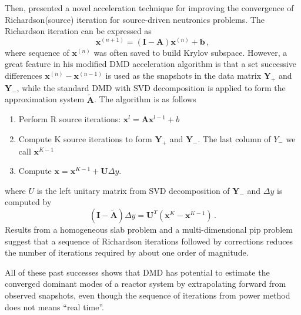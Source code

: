 Then, \citet{mcclarren_acceleration_2018} presented a novel acceleration technique for improving the convergence of Richardson(source) iteration for source-driven neutronics problems.
The Richardson iteration can be expressed as 
\begin{equation}
 \mathbf{x}^{(n+1)} = (\mathbf{I}-\mathbf{A})\mathbf{x}^{(n)} + \mathbf{b} \, ,
 \label{eq:richardson}
\end{equation}
where sequence of $\mathbf{x}^{(n)}$ was often saved to build Krylov subspace. 
However, a great feature in his modified DMD acceleration algorithm is that a set successive differences $\mathbf{x}^{(n)}-\mathbf{x}^{(n-1)}$ is used as the snapshots in the data matrix $\mathbf{Y}_+$ and $\mathbf{Y}_-$, while the standard DMD with SVD decomposition is applied to form the approximation system $\mathbf{\tilde{A}}$.
The algorithm is as follows
\begin{enumerate}
 \item Perform R source iterations: $\mathbf{x}^{l} = \mathbf{A} \mathbf{x}^{l-1} +b$
 \item Compute K source iterations to form $\mathbf{Y}_+$ and $\mathbf{Y}_-$. The last column of $Y_-$ we call $\mathbf{x}^{K-1}$ 
 \item Compute $\mathbf{x} = \mathbf{x}^{K-1} + \mathbf{U} \Delta y$.
\end{enumerate} 
where $U$ is the left unitary matrix from SVD decomposition of $\mathbf{Y}_-$ and $\Delta y$ is computed by 
\begin{equation}
 (\mathbf{I} - \mathbf{\tilde{A}}) \Delta y = \mathbf{U}^T(\mathbf{x}^{K} - \mathbf{x}^{K-1})\, .
 \label{eq:McClarren}
\end{equation}
Results from a homogeneous slab problem and a multi-dimensional pip problem suggest that a sequence of Richardson iterations followed by corrections reduces the number of iterations required by about one order of magnitude.

All of these past successes shows that DMD has potential to estimate the converged dominant modes of a reactor system by extrapolating forward from observed snapshots, even though the sequence of iterations from power method does not means ``real time''.

